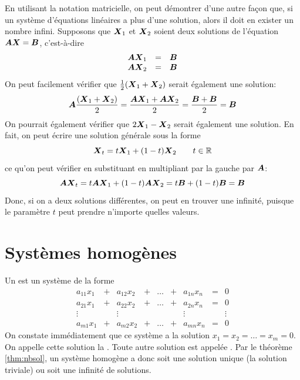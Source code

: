 En utilisant la notation matricielle, on peut démontrer d'une autre façon que, 
si un système d'équations linéaires a plus d'une solution,	alors il doit en exister un nombre infini. 
Supposons que $\boldsymbol{X}_1$ et $\boldsymbol{X}_2$ soient deux solutions de l'équation $\boldsymbol{A}\boldsymbol{X}=\boldsymbol{B}$, c'est-à-dire
\[
\begin{matrix}
\boldsymbol{A}\boldsymbol{X}_1 &=& \boldsymbol{B} \\
\boldsymbol{A}\boldsymbol{X}_2 &=& \boldsymbol{B}
\end{matrix}
\]
On peut facilement vérifier que $\frac{1}{2}(\boldsymbol{X}_1 + \boldsymbol{X}_2)$ serait également une solution:
\[
\boldsymbol{A} \frac{(\boldsymbol{X}_1 + \boldsymbol{X}_2)}{2} = \frac{\boldsymbol{A}\boldsymbol{X}_1 + \boldsymbol{A}\boldsymbol{X}_2}{2} = \frac{\boldsymbol{B} + \boldsymbol{B}}{2} = \boldsymbol{B}
\]
On pourrait également vérifier que $2\boldsymbol{X}_1 - \boldsymbol{X}_2$ serait également une solution. En fait, on peut écrire une
solution générale sous la forme 
	\[
	\boldsymbol{X}_t = t \boldsymbol{X}_1 + (1-t) \boldsymbol{X}_2 \qquad t\in\mathbb{R}
	\]
ce qu'on peut vérifier en substituant en multipliant par la gauche par $\boldsymbol{A}$:
	\[
	\boldsymbol{A}\boldsymbol{X}_t = t \boldsymbol{A}\boldsymbol{X}_1 + (1-t) \boldsymbol{A}\boldsymbol{X}_2 = t\boldsymbol{B} + (1-t)\boldsymbol{B} = \boldsymbol{B}
	\]
Donc, si on a deux solutions différentes, on peut en trouver une infinité, puisque le paramètre $t$ peut prendre n'importe quelles valeurs.



\section{Systèmes homogènes}
Un  est un système de la forme
\[
	\begin{matrix}
	a_{11}x_1 &+& a_{12}x_2 &+& \ldots &+& a_{1n}x_n &=& 0 \\
	a_{21}x_1 &+& a_{22}x_2 &+& \ldots &+& a_{2n}x_n &=& 0 \\
	\vdots && \vdots &&  && \vdots && \vdots \\
	a_{m1}x_1 &+& a_{m2}x_2 &+& \ldots &+& a_{mn}x_n &=& 0
	\end{matrix}
\]
On constate immédiatement que ce système a la solution
$x_1 = x_2 =\ldots = x_m = 0$.  On appelle cette solution la .
Toute autre solution est appelée .
Par le théorème \ref{thm:nbsol}, un système homogène a donc soit une solution unique (la solution triviale)
ou soit une infinité de solutions.

